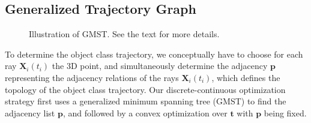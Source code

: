 \subsection{Generalized Trajectory Graph}
\begin{figure}[t]
\centering
{}
\caption[Illustration of the generalized minimum spanning tree (GMST)]{Illustration of GMST. See the text for more details.}
\label{fig:gmst}
\end{figure}

\label{sec:gmst}
To determine the object class trajectory, we conceptually have to choose for each ray $\mathbf{X}_i(t_i)$ the 3D point, and simultaneously determine the adjacency $\mathbf{p}$ representing the adjacency relations of the rays $\mathbf{X}_i(t_i)$, which defines the topology of the object class trajectory.
Our discrete-continuous optimization strategy first uses a generalized minimum spanning tree (GMST) to find the adjacency list $\mathbf{p}$, and followed by a convex optimization over $\mathbf{t}$ with $\mathbf{p}$ being fixed.

